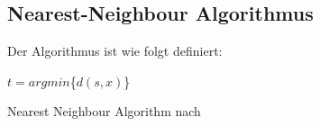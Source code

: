 \documentclass[fontsize=11pt]{scrartcl}
\begin{document}
                        
            \subsection{Nearest-Neighbour Algorithmus}
            \label{subsec:nnalgo}
             Der Algorithmus ist wie folgt definiert:\par
                            \begin{algorithm}[H]
                                    	$t= argmin$\{$d(s,x)$\}\;
                                    {
                                        \KwRet{-}\;
                                    }
                                \caption{Nearest Neighbour Algorithm nach \cite[S.208]{ertel2016}}
                            \end{algorithm}
				
\end{document}
